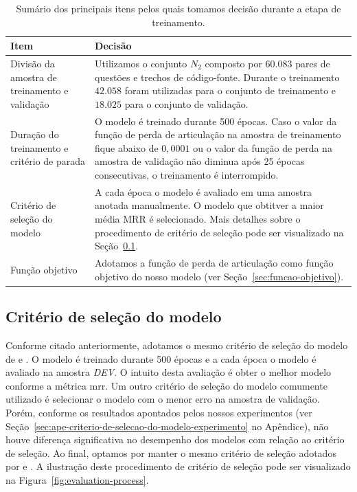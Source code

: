 \begin{table}[h]
\centering
\caption{Sumário dos principais itens pelos quais tomamos decisão durante a etapa de treinamento.}
\begin{tabular}{ | p{5cm} | p{10cm} |  }
\hline
\textbf{Item} & \textbf{Decisão} \\
\hline
 Divisão da amostra de treinamento e validação & Utilizamos o conjunto $N_{2}$ composto por $60.083$ pares de questões e trechos de código-fonte. Durante o treinamento $42.058$ foram utilizadas para o conjunto de treinamento e $18.025$ para o conjunto de validação.\\


\hline
 
Duração do treinamento e critério de parada & O modelo é treinado durante 500 épocas. Caso o valor da função de perda de articulação na amostra de treinamento fique abaixo de $0,0001$ ou o valor da função de perda na amostra de validação não diminua após 25 épocas consecutivas, o treinamento é interrompido.\\

 \hline
Critério de seleção do modelo & A cada época o modelo é avaliado em uma amostra anotada manualmente. O modelo que obtitver a maior média MRR é selecionado. Mais detalhes sobre o procedimento de critério de seleção pode ser visualizado na Seção~\ref{sec:criterio-selecao-modelo-treinamento}.\\
 
 \hline
 
 Função objetivo & Adotamos a função de perda de articulação como função objetivo do nosso modelo (ver Seção~\ref{sec:funcao-objetivo}). \\
 
  \hline
 
\end{tabular}
\label{table:training-decisions}
\end{table}

\subsection{Critério de seleção do modelo}
\label{sec:criterio-selecao-modelo-treinamento}

Conforme citado anteriormente, adotamos o mesmo critério de seleção do modelo de  e . O modelo é treinado durante 500 épocas e a cada época o modelo é avaliado na amostra \emph{DEV}. O intuito desta avaliação é obter o melhor modelo conforme a métrica \acrshort{mrr}. Um outro critério de seleção do modelo comumente utilizado é selecionar o modelo com o menor erro na amostra de validação. Porém, conforme os resultados apontados pelos nossos experimentos (ver Seção~\ref{sec:ape-criterio-de-selecao-do-modelo-experimento} no Apêndice), não houve diferença significativa no desempenho dos modelos com relação ao critério de seleção. Ao final, optamos por manter o mesmo critério de seleção adotados por  e . A ilustração deste procedimento de critério de seleção pode ser visualizado na Figura~\ref{fig:evaluation-process}.

